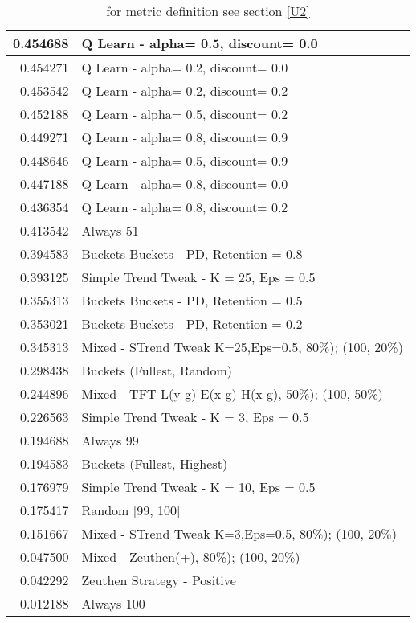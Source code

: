 \begin{table}[!hbtp]
\begin{footnotesize}
\begin{tabular}{|r|l|}
0.454688 & Q Learn - alpha= 0.5, discount= 0.0\\ \hline
0.454271 & Q Learn - alpha= 0.2, discount= 0.0\\ \hline
0.453542 & Q Learn - alpha= 0.2, discount= 0.2\\ \hline
0.452188 & Q Learn - alpha= 0.5, discount= 0.2\\ \hline
0.449271 & Q Learn - alpha= 0.8, discount= 0.9\\ \hline
0.448646 & Q Learn - alpha= 0.5, discount= 0.9\\ \hline
0.447188 & Q Learn - alpha= 0.8, discount= 0.0\\ \hline
0.436354 & Q Learn - alpha= 0.8, discount= 0.2\\ \hline
0.413542 & Always 51\\ \hline
0.394583 & Buckets Buckets - PD, Retention = 0.8\\ \hline
0.393125 & Simple Trend Tweak - K = 25, Eps = 0.5\\ \hline
0.355313 & Buckets Buckets - PD, Retention = 0.5\\ \hline
0.353021 & Buckets Buckets - PD, Retention = 0.2\\ \hline
0.345313 & Mixed - {STrend Tweak K=25,Eps=0.5, 80\%); (100, 20\%)}\\ \hline
0.298438 & Buckets (Fullest, Random)\\ \hline
0.244896 & Mixed - {TFT L(y-g) E(x-g) H(x-g), 50\%); (100, 50\%)}\\ \hline
0.226563 & Simple Trend Tweak - K = 3, Eps = 0.5\\ \hline
0.194688 & Always 99\\ \hline
0.194583 & Buckets (Fullest, Highest)\\ \hline
0.176979 & Simple Trend Tweak - K = 10, Eps = 0.5\\ \hline
0.175417 & Random [99, 100]\\ \hline
0.151667 & Mixed - {STrend Tweak K=3,Eps=0.5, 80\%); (100, 20\%)}\\ \hline
0.047500 & Mixed - {Zeuthen(+), 80\%); (100, 20\%)}\\ \hline
0.042292 & Zeuthen Strategy - Positive\\ \hline
0.012188 & Always 100\\ \hline
\end{tabular}
\caption{for metric definition see section \eqref{U2}}
\end{footnotesize}
\end{table}

